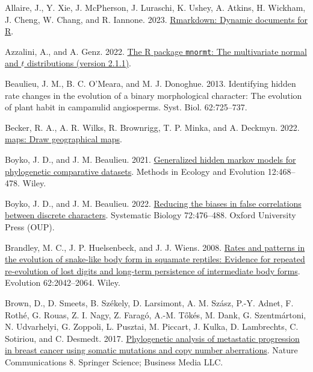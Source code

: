 \documentclass[fleqn,10pt,lineno]{wlpeerj} %
\newlength{\cslhangindent}
\newenvironment{CSLReferences}[2] %
 {\begin{list}{}{%
  \setlength{\itemindent}{0pt}
  \setlength{\leftmargin}{0pt}
  \setlength{\parsep}{0pt}
  \ifodd #1
   \setlength{\leftmargin}{\cslhangindent}
   \setlength{\itemindent}{-1\cslhangindent}
  \fi
  \setlength{\itemsep}{#2\baselineskip}}}
 {\end{list}}
\begin{document}
\label{refs}
\begin{CSLReferences}{1}{0}
Allaire, J., Y. Xie, J. McPherson, J. Luraschi, K. Ushey, A. Atkins, H. Wickham, J. Cheng, W. Chang, and R. Iannone. 2023. \href{https://github.com/rstudio/rmarkdown}{{R}markdown: Dynamic documents for {R}}.

Azzalini, A., and A. Genz. 2022. \href{http://azzalini.stat.unipd.it/SW/Pkg-mnormt/}{The {R} package \texttt{mnormt}: The multivariate normal and \(t\) distributions (version 2.1.1)}.

Beaulieu, J. M., B. C. O'Meara, and M. J. Donoghue. 2013. Identifying hidden rate changes in the evolution of a binary morphological character: The evolution of plant habit in campanulid angiosperms. Syst. Biol. 62:725--737.

Becker, R. A., A. R. Wilks, R. Brownrigg, T. P. Minka, and A. Deckmyn. 2022. \href{https://CRAN.R-project.org/package=maps}{{maps}: Draw geographical maps}.

Boyko, J. D., and J. M. Beaulieu. 2021. \href{https://doi.org/10.1111/2041-210x.13534}{Generalized hidden markov models for phylogenetic comparative datasets}. Methods in Ecology and Evolution 12:468--478. Wiley.

Boyko, J. D., and J. M. Beaulieu. 2022. \href{https://doi.org/10.1093/sysbio/syac066}{Reducing the biases in false correlations between discrete characters}. Systematic Biology 72:476--488. Oxford University Press (OUP).

Brandley, M. C., J. P. Huelsenbeck, and J. J. Wiens. 2008. \href{https://doi.org/10.1111/j.1558-5646.2008.00430.x}{Rates and patterns in the evolution of snake-like body form in squamate reptiles: Evidence for repeated re-evolution of lost digits and long-term persistence of intermediate body forms}. Evolution 62:2042--2064. Wiley.

Brown, D., D. Smeets, B. Székely, D. Larsimont, A. M. Szász, P.-Y. Adnet, F. Rothé, G. Rouas, Z. I. Nagy, Z. Faragó, A.-M. Tőkés, M. Dank, G. Szentmártoni, N. Udvarhelyi, G. Zoppoli, L. Pusztai, M. Piccart, J. Kulka, D. Lambrechts, C. Sotiriou, and C. Desmedt. 2017. \href{https://doi.org/10.1038/ncomms14944}{Phylogenetic analysis of metastatic progression in breast cancer using somatic mutations and copy number aberrations}. Nature Communications 8. Springer Science; Business Media LLC.


\end{CSLReferences}
\end{document}
